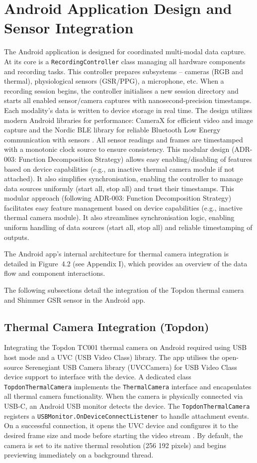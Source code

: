 \section{Android Application Design and Sensor Integration}\label{sec:4-2}
The Android application is designed for coordinated multi-modal data capture. At its core is a \texttt{RecordingController} class managing all hardware components and recording tasks. This controller prepares subsystems -- cameras (RGB and thermal), physiological sensors (GSR/PPG), a microphone, etc. When a recording session begins, the controller initialises a new session directory and starts all enabled sensor/camera captures with nanosecond-precision timestamps. Each modality's data is written to device storage in real time. The design utilizes modern Android libraries for performance: CameraX for efficient video and image capture \cite{ref13} and the Nordic BLE library for reliable Bluetooth Low Energy communication with sensors \cite{ref14}. All sensor readings and frames are timestamped with a monotonic clock source to ensure consistency. This modular design (ADR-003: Function Decomposition Strategy) allows easy enabling/disabling of features based on device capabilities (e.g., an inactive thermal camera module if not attached). It also simplifies synchronisation, enabling the controller to manage data sources uniformly (start all, stop all) and trust their timestamps. This modular approach (following ADR-003: Function Decomposition Strategy) facilitates easy feature management based on device capabilities (e.g., inactive thermal camera module). It also streamlines synchronisation logic, enabling uniform handling of data sources (start all, stop all) and reliable timestamping of outputs.

The Android app's internal architecture for thermal camera integration is detailed in Figure~4.2 (see Appendix I), which provides an overview of the data flow and component interactions.

The following subsections detail the integration of the Topdon thermal camera and Shimmer GSR sensor in the Android app.

\subsection{Thermal Camera Integration (Topdon)}\label{sec:4-2-1}
Integrating the Topdon TC001 thermal camera on Android required using USB host mode and a UVC (USB Video Class) library. The app utilises the open-source Serenegiant USB Camera library (UVCCamera) for USB Video Class device support \cite{ref16} to interface with the device. A dedicated class \texttt{TopdonThermalCamera} implements the \texttt{ThermalCamera} interface and encapsulates all thermal camera functionality. When the camera is physically connected via USB-C, an Android USB monitor detects the device. The \texttt{TopdonThermalCamera} registers a \texttt{USBMonitor.OnDeviceConnectListener} to handle attachment events. On a successful connection, it opens the UVC device and configures it to the desired frame size and mode before starting the video stream \cite{ref16}. By default, the camera is set to its native thermal resolution (256\,\texttimes\,192 pixels) and begins previewing immediately on a background thread.

